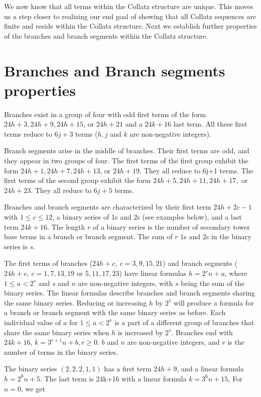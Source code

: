 \documentclass[sn-mathphys-num, pdflatex]{sn-jnl}
\begin{document}
We now know that all terms within the Collatz structure are unique. This moves us a step closer to realizing our end goal of showing that all Collatz sequences are finite and reside within the Collatz structure. Next we establish further properties of the branches and branch segments within the Collatz structure.

\section{Branches and Branch segments properties}\label{sec4}
Branches exist in a group of four with odd first terms of the form $24h+3, 24h+9, 24h+15$, or $24h+21$ and a $24k+16$ last term. All these first terms reduce to $6j+3$ terms ($h, j$ and $k$ are non-negative integers). 

Branch segments arise in the middle of branches. Their first terms are odd, and they appear in two groups of four. The first terms of the first group exhibit the form $24h+1, 24h+7, 24h+13$, or $24h+19$. They all reduce to 6j+1 terms. The first terms of the second group exhibit the form $24h+5, 24h+11, 24h+17,$ or $24h+23$. They all reduce to $6j+5$ terms. 

Branches and branch segments are characterized by their first term $24h+2c-1$ with $1 \le c \le 12$, a binary series of 1s and 2s (see examples below), and a last term $24k+16$. The length $r$ of a binary series is the number of secondary tower base terms in a branch or branch segment. The sum of $r$ 1s and 2s in the binary series is $s$.

The first terms of branches ($24h+c,\ c=3, 9, 15, 21$) and branch segments ($24h+c,\ c = 1, 7, 13, 19 \text{ or }5, 11, 17, 23$) have linear formulas $h = 2^sn+a$, where $1 \le a < 2^s$ and $s$ and $n$ are non-negative integers, with $s$ being the sum of the binary series. The linear formulas describe branches and branch segments sharing the same binary series. Reducing or increasing $h$ by $2^s$ will produce a formula for a branch or branch segment with the same binary series as before. Each individual value of $a$ for $1 \le a < 2^s$ is a part of a different group of branches that share the same binary series when $h$ is increased by $2^s$. Branches end with $24k+16$, $k=3^{r+1}n+b, r \ge 0.$ $b$ and $n$ are non-negative integers, and $r$ is the number of terms in the binary series.

The binary series $(2,2,2,1,1)$ has a first term  
$24h+9$, and a linear formula $h = 2^8n+5$. The last term is 24k+16 with a linear formula $k=3^{6}n+15$, For $n = 0$, we get \\
\end{document}
